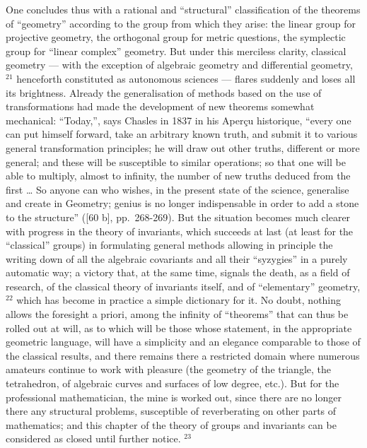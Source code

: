 One concludes thus with a rational and ``structural'' classification of the theorems of ``geometry'' according to the group from which they arise: the linear group for projective geometry, the orthogonal group for metric questions, the symplectic group for ``linear complex'' geometry. But under this merciless clarity, classical geometry --- with the exception of algebraic geometry and differential geometry, \(^{21}\) henceforth constituted as autonomous sciences --- flares suddenly and loses all its brightness. Already the generalisation of methods based on the use of transformations had made the development of new theorems somewhat mechanical: ``Today,'', says Chasles in 1837 in his Aperçu historique, ``every one can put himself forward, take an arbitrary known truth, and submit it to various general transformation principles; he will draw out other truths, different or more general; and these will be susceptible to similar operations; so that one will be able to multiply, almost to infinity, the number of new truths deduced from the first \ldots{} So anyone can who wishes, in the present state of the science, generalise and create in Geometry; genius is no longer indispensable in order to add a stone to the structure'' ({[}60 b{]}, pp.~268-269). But the situation becomes much clearer with progress in the theory of invariants, which succeeds at last (at least for the ``classical'' groups) in formulating general methods allowing in principle the writing down of all the algebraic covariants and all their ``syzygies'' in a purely automatic way; a victory that, at the same time, signals the death, as a field of research, of the classical theory of invariants itself, and of ``elementary'' geometry, \(^{22}\) which has become in practice a simple dictionary for it. No doubt, nothing allows the foresight a priori, among the infinity of ``theorems'' that can thus be rolled out at will, as to which will be those whose statement, in the appropriate geometric language, will have a simplicity and an elegance comparable to those of the classical results, and there remains there a restricted domain where numerous amateurs continue to work with pleasure (the geometry of the triangle, the tetrahedron, of algebraic curves and surfaces of low degree, etc.). But for the professional mathematician, the mine is worked out, since there are no longer there any structural problems, susceptible of reverberating on other parts of mathematics; and this chapter of the theory of groups and invariants can be considered as closed until further notice. \(^{23}\)

